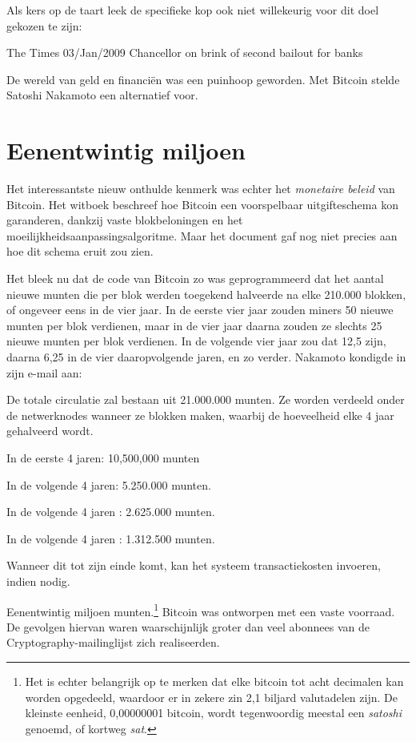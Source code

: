 \documentclass[
  a5paper,
  smalldemyvopaper,11pt,twoside,onecolumn,openright,extrafontsizes,
hidelinks]{memoir}
\renewenvironment{quote}%
               {\list{}{\rightmargin=.3cm\leftmargin=.3cm}%
                \itshape \item[]}%
               {\endlist}
\begin{document}
Als kers op de taart leek de specifieke kop ook niet willekeurig voor
dit doel gekozen te zijn:

\begin{quote}
The Times 03/Jan/2009 Chancellor on brink of second bailout for banks
\end{quote}

De wereld van geld en financiën was een puinhoop geworden. Met Bitcoin
stelde Satoshi Nakamoto een alternatief voor.

\section{Eenentwintig miljoen}\label{eenentwintig-miljoen}

Het interessantste nieuw onthulde kenmerk was echter het \emph{monetaire
beleid} van Bitcoin. Het witboek beschreef hoe Bitcoin een voorspelbaar
uitgifteschema kon garanderen, dankzij vaste blokbeloningen en het
moeilijkheidsaanpassingsalgoritme. Maar het document gaf nog niet
precies aan hoe dit schema eruit zou zien.

Het bleek nu dat de code van Bitcoin zo was geprogrammeerd dat het
aantal nieuwe munten die per blok werden toegekend halveerde na elke
210.000 blokken, of ongeveer eens in de vier jaar. In de eerste vier
jaar zouden miners 50 nieuwe munten per blok verdienen, maar in de vier
jaar daarna zouden ze slechts 25 nieuwe munten per blok verdienen. In de
volgende vier jaar zou dat 12,5 zijn, daarna 6,25 in de vier
daaropvolgende jaren, en zo verder. Nakamoto kondigde in zijn e-mail
aan:

\begin{quote}
De totale circulatie zal bestaan uit 21.000.000 munten. Ze worden
verdeeld onder de netwerknodes wanneer ze blokken maken, waarbij de
hoeveelheid elke 4 jaar gehalveerd wordt.

In de eerste 4 jaren: 10,500,000 munten

In de volgende 4 jaren: 5.250.000 munten.

In de volgende 4 jaren : 2.625.000 munten.

In de volgende 4 jaren : 1.312.500 munten.

Wanneer dit tot zijn einde komt, kan het systeem transactiekosten
invoeren, indien nodig.
\end{quote}

Eenentwintig miljoen munten.\footnote{Het is echter belangrijk op te
  merken dat elke bitcoin tot acht decimalen kan worden opgedeeld,
  waardoor er in zekere zin 2,1 biljard valutadelen zijn. De kleinste
  eenheid, 0,00000001 bitcoin, wordt tegenwoordig meestal een
  \emph{satoshi} genoemd, of kortweg \emph{sat}.} Bitcoin was ontworpen
met een vaste voorraad. De gevolgen hiervan waren waarschijnlijk groter
dan veel abonnees van de Cryptography-mailinglijst zich realiseerden.
\end{document}
